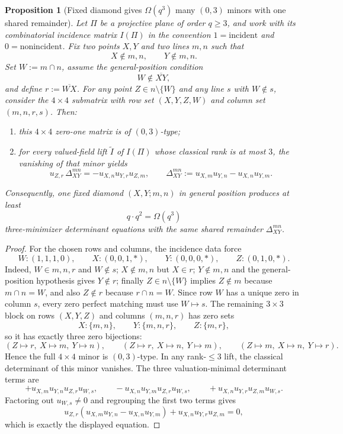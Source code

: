 \documentclass[11pt]{amsart}
\numberwithin{equation}{section}
\theoremstyle{plain}
\newtheorem{proposition}[theorem]{Proposition}
\theoremstyle{definition}
\theoremstyle{remark}
\begin{document}
\begin{proposition}[Fixed diamond gives $\Omega(q^3)$ many $(0,3)$ minors with one shared remainder]
\label{prop:fixed-diamond-many-completions}
Let $\Pi$ be a projective plane of order $q\ge 3$, and work with its combinatorial incidence matrix $I(\Pi)$ in the convention
$1=\text{incident}$ and $0=\text{nonincident}$. Fix two points $X,Y$ and two lines $m,n$ such that
\[
X\notin m,n,
\qquad
Y\notin m,n.
\]
Set $W:=m\cap n$, assume the general-position condition
\[
W\notin \overline{XY},
\]
and define $r:=\overline{WX}$. For any point $Z\in n\setminus\{W\}$ and any line $s$ with $W\notin s$, consider the $4\times4$ submatrix
with row set $(X,Y,Z,W)$ and column set $(m,n,r,s)$. Then:
\begin{enumerate}[leftmargin=2em]
  \item this $4\times4$ zero-one matrix is of $(0,3)$-type;
  \item for every valued-field lift $\widetilde I$ of $I(\Pi)$ whose classical rank is at most $3$, the vanishing of that minor yields
  \[
  u_{Z,r}\,\Delta_{XY}^{mn}=-u_{X,n}u_{Y,r}u_{Z,m},
  \qquad
  \Delta_{XY}^{mn}:=u_{X,m}u_{Y,n}-u_{X,n}u_{Y,m}.
  \]
\end{enumerate}
Consequently, one fixed diamond $(X,Y;m,n)$ in general position produces at least
\[
q\cdot q^2=\Omega(q^3)
\]
three-minimizer determinant equations with the same shared remainder $\Delta_{XY}^{mn}$.
\end{proposition}

\begin{proof}
For the chosen rows and columns, the incidence data force
\[
W:(1,1,1,0),\qquad X:(0,0,1,*),\qquad Y:(0,0,0,*),\qquad Z:(0,1,0,*).
\]
Indeed, $W\in m,n,r$ and $W\notin s$; $X\notin m,n$ but $X\in r$; $Y\notin m,n$ and the general-position hypothesis gives
$Y\notin r$; finally $Z\in n\setminus\{W\}$ implies $Z\notin m$ because $m\cap n=W$, and also $Z\notin r$ because $r\cap n=W$.
Since row $W$ has a unique zero in column $s$, every zero perfect matching must use $W\mapsto s$. The remaining $3\times3$ block on rows
$(X,Y,Z)$ and columns $(m,n,r)$ has zero sets
\[
X:\{m,n\},\qquad Y:\{m,n,r\},\qquad Z:\{m,r\},
\]
so it has exactly three zero bijections:
\[
(Z\mapsto r,\ X\mapsto m,\ Y\mapsto n),\qquad
(Z\mapsto r,\ X\mapsto n,\ Y\mapsto m),\qquad
(Z\mapsto m,\ X\mapsto n,\ Y\mapsto r).
\]
Hence the full $4\times4$ minor is $(0,3)$-type. In any rank-$\le 3$ lift, the classical determinant of this minor vanishes. The three
valuation-minimal determinant terms are
\[
+u_{X,m}u_{Y,n}u_{Z,r}u_{W,s},\qquad
-u_{X,n}u_{Y,m}u_{Z,r}u_{W,s},\qquad
+u_{X,n}u_{Y,r}u_{Z,m}u_{W,s}.
\]
Factoring out $u_{W,s}\neq 0$ and regrouping the first two terms gives
\[
u_{Z,r}\left(u_{X,m}u_{Y,n}-u_{X,n}u_{Y,m}\right)+u_{X,n}u_{Y,r}u_{Z,m}=0,
\]
which is exactly the displayed equation.
\end{proof}
\end{document}
